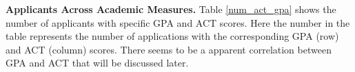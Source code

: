 \documentclass[12pt,english]{report}
\begin{document}

\vspace{0.1in}
\noindent \textbf{Applicants Across Academic Measures.}  Table \ref{num_act_gpa} shows the number of applicants with specific GPA and ACT scores.  Here the number in the table represents the number of applications with the corresponding GPA (row) and ACT (column) scores. There seems to be a apparent correlation between GPA and ACT that will be discussed later. 
\end{document}
